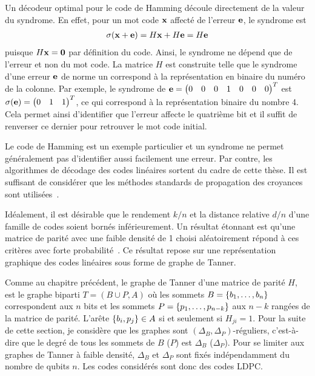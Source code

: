 Un décodeur optimal pour le code de Hamming découle directement de la valeur du syndrome.
En effet, pour un mot code $\vb x$ affecté de l'erreur $\vb e$,
le syndrome est 
\begin{align}
	\sigma(\vb x + \vb e) = H\vb x + H\vb e = H\vb e
\end{align}
puisque $H \vb x = \vb 0$ par définition du code.
Ainsi, le syndrome ne dépend que de l'erreur et non du mot code.
La matrice $H$ est construite telle que le syndrome d'une erreur $\vb e$ de norme un
correspond à la représentation en binaire du numéro de la colonne.
Par exemple,
le syndrome de $\vb e = \begin{pmatrix} 0 & 0 & 0 & 1 & 0 & 0 & 0 \end{pmatrix}^T$
est $\sigma(\vb e) = \begin{pmatrix} 0 & 1 & 1 \end{pmatrix}^T$,
ce qui correspond à la représentation binaire du nombre 4.
Cela permet ainsi d'identifier que l'erreur affecte le quatrième bit et 
il suffit de renverser ce dernier pour retrouver le mot code initial.

Le code de Hamming est un exemple particulier et un syndrome ne permet généralement
pas d'identifier aussi facilement une erreur.
Par contre,
les algorithmes de décodage des codes linéaires sortent du cadre de cette thèse.
Il est suffisant de considérer que les méthodes standards de propagation des 
croyances sont utilisées~\cite{richardson_modern_2008}.

Idéalement,
il est désirable que 
le rendement $k/n$ et la distance relative $d/n$ d'une famille de codes
soient bornés inférieurement.
Un résultat étonnant est qu'une matrice de parité avec une faible densité de 1
choisi aléatoirement répond à ces critères avec forte probabilité~\cite{sipser_expander_1996}.
Ce résultat repose sur une représentation graphique des codes linéaires sous forme de graphe de Tanner.

Comme au chapitre précédent,
le graphe de Tanner d'une matrice de parité $H$,
est le graphe biparti $T = (B \cup P, A)$
où les sommets $B = \qty{b_1, \ldots, b_n}$ correspondent aux $n$ bits
et les sommets $P = \qty{p_1, \ldots, p_{n - k}}$ aux $n - k$ rangées de la matrice de parité.
L'arête $\qty{b_i, p_j} \in A$ si et seulement si $H_{ji} = 1$.
Pour la suite de cette section,
je considère que les graphes sont $(\Delta_B, \Delta_P)$-réguliers,
c'est-à-dire que le degré de tous les sommets de $B$ ($P$) est $\Delta_B$ ($\Delta_P$).
Pour se limiter aux graphes de Tanner à faible densité,
$\Delta_B$ et $\Delta_P$ sont fixés indépendamment du nombre de qubits $n$.
Les codes considérés sont donc des codes LDPC.

